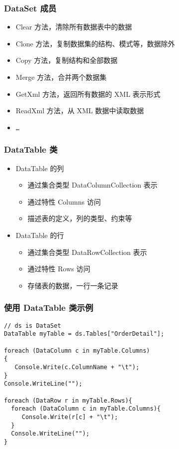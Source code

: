 \begin{frame}
\frametitle{DataSet 成员}
\begin{itemize}
\setlength{\itemsep}{8pt plus 1pt}
\item Clear 方法，清除所有数据表中的数据
\item Clone 方法，复制数据集的结构、模式等，数据除外
\item Copy 方法，复制结构和全部数据
\item Merge 方法，合并两个数据集
\item GetXml 方法，返回所有数据的 XML 表示形式
\item ReadXml 方法，从 XML 数据中读取数据
\item \texttt{\dots}
\end{itemize}
\end{frame}

\begin{frame}
\frametitle{DataTable 类}
\begin{itemize}
\setlength{\itemsep}{8pt plus 1pt}
\item DataTable 的列
\begin{itemize}
\setlength{\itemsep}{4pt plus 1pt}
\item 通过集合类型 DataColumnCollection 表示
\item 通过特性 Columns 访问
\item 描述表的定义，列的类型、约束等
\end{itemize}
\item DataTable 的行
\begin{itemize}
\setlength{\itemsep}{4pt plus 1pt}
\item 通过集合类型 DataRowCollection 表示
\item 通过特性 Rows 访问
\item 存储表的数据，一行一条记录
\end{itemize}
\end{itemize}
\end{frame}

\begin{frame}[fragile]
\frametitle{使用 DataTable 类示例}
\begin{lstlisting}
// ds is DataSet
DataTable myTable = ds.Tables["OrderDetail"];

foreach (DataColumn c in myTable.Columns)
{
   Console.Write(c.ColumnName + "\t");
}
Console.WriteLine("");

foreach (DataRow r in myTable.Rows){
  foreach (DataColumn c in myTable.Columns){
     Console.Write(r[c] + "\t");
  }
  Console.WriteLine("");
}

\end{lstlisting}
\end{frame}

